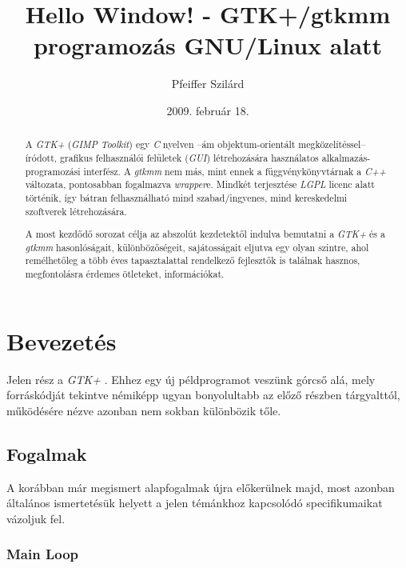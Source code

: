 \documentclass[a4paper,10pt]{article}
\title{Hello Window! - GTK+/gtkmm programozás GNU/Linux alatt}
\author{Pfeiffer Szilárd}
\date{2009. február 18.}
\begin{document}
\maketitle

\begin{abstract}
A \textit{GTK+} (\textit{GIMP Toolkit}) egy \textit{C} nyelven --ám objektum-orientált meg\-kö\-ze\-lí\-tés\-sel-- íródott, grafikus felhasználói felületek (\textit{GUI}) létrehozására használatos al\-kal\-ma\-zás-programozási interfész. A \textit{gtkmm} nem más, mint ennek a függvénykönyvtárnak a \textit{C++} változata, pontosabban fogalmazva \textit{wrapper}e. Mindkét terjesztése \textit{LGPL} licenc alatt történik, így bátran felhasználható mind szabad/ingyenes, mind kereskedelmi szoftverek létrehozására.

A most kezdődő sorozat célja az abszolút kezdetektől indulva bemutatni a \textit{GTK+} és a \textit{gtkmm} hasonlóságait, különbözőségeit, sajátosságait eljutva egy olyan szintre, ahol remélhetőleg a több éves tapasztalattal rendelkező fejlesztők is találnak hasznos, megfontolásra érdemes ötleteket, információkat.
\end{abstract}

\newpage

\tableofcontents

\newpage

\section{Bevezetés}

Jelen rész a \textit{GTK+} . Ehhez egy új példprogramot veszünk górcső alá, mely forráskódját tekintve némiképp ugyan bonyolultabb az előző részben tárgyalttól, működésére nézve azonban nem sokban különbözik tőle.

\subsection{Fogalmak}

A korábban már megismert alapfogalmak újra előkerülnek majd, most azonban általános ismertetésük helyett a jelen témánkhoz kapcsolódó specifikumaikat vázoljuk fel.

\subsubsection{Main Loop}
\end{document}

